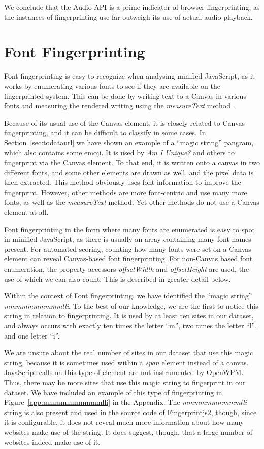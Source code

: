 \documentclass[
    fontsize=12pt,
    headings=small,
    parskip=half,
    bibliography=totoc,
    numbers=noenddot,
    open=any
    ]{scrreprt}
\begin{document}
We conclude that the Audio API is a prime indicator of browser fingerprinting, as the instances of
fingerprinting use far outweigh its use of actual audio playback.


\section{Font Fingerprinting}
\label{sec:font_fingerprinting}
Font fingerprinting is easy to recognize when analysing minified JavaScript,
as it works by enumerating various fonts to see if they are available on the fingerprinted
system. This can be done by writing text to a Canvas in various fonts and measuring
the rendered writing using the \textit{measureText} method \cite{englehardt2016census}.

Because of its usual use of the Canvas element, it is closely related to Canvas fingerprinting,
and it can be difficult to classify in some cases. In Section~\ref{sec:todataurl}
we have shown an example of a ``magic string'' pangram, which also contains some emoji.
It is used by \textit{Am I Unique?} and others to fingerprint via the Canvas element.
To that end, it is written onto a canvas in two different fonts, and some other elements are drawn
as well, and the pixel data is then extracted. This method obviously uses font information
to improve the fingerprint.
However, other methods are more font-centric and use many more fonts, as well as the \textit{measureText}
method.
Yet other methods do not use a Canvas element at all.

Font fingerprinting in the form where many fonts are enumerated is easy to spot in minified JavaScript,
as there is usually an array containing many font names present.
For automated scoring, counting how many fonts were set on a Canvas element can reveal Canvas-based
font fingerprinting. For non-Canvas based font enumeration, the property accessors
\textit{offsetWidth} and \textit{offsetHeight} are used, the use of which we can also count.
This is described in greater detail below.

Within the context of Font fingerprinting, we have identified the ``magic string''
\textit{mmmmmmmmmmlli}. To the best of our knowledge, we are the first to notice this string
in relation to fingerprinting. It is used by at least ten sites in our dataset, and always occurs
with exactly ten times the letter ``m'', two times the letter ``l'', and one letter ``i''.

We are unsure about the real number of sites in our dataset that use this magic string, because
it is sometimes used within a \textit{span} element instead of a canvas.
JavaScript calls on this type of element are not instrumented by OpenWPM.
Thus, there may be more sites that use this magic string to fingerprint
in our dataset.
We have included an example of this type of fingerprinting in Figure~\ref{app:mmmmmmmmmmlli}
in the Appendix.
The \textit{mmmmmmmmmmlli} string is also present and used in the source code of Fingerprintjs2,
though, since it is configurable, it does not reveal much more information about how many websites
make use of the string. It does suggest, though, that a large number of websites indeed make use of it.
\end{document}
